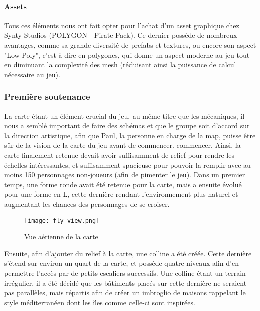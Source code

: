     \paragraph{Assets}

        Tous ces éléments nous ont fait opter pour l'achat d'un asset graphique chez 
        Synty Studios (POLYGON - Pirate Pack).
        Ce dernier possède de nombreux avantages, comme sa grande diversité de prefabs et 
        textures, ou encore son aspect "Low Poly", 
        c'est-à-dire en polygones, qui donne un aspect moderne au jeu tout en diminuant la 
        complexité des mesh (réduisant ainsi la 
        puissance de calcul nécessaire au jeu).
        

\vspace{0.5cm}
\subsubsection{Première soutenance}
\vspace{0.5cm}

    La carte étant un élément crucial du jeu, au même titre que les mécaniques, 
    il nous a semblé important de faire des schémas et que le groupe soit d'accord sur la direction artistique,
    afin que Paul, la personne en charge de la map, puisse être sûr de la vision de la carte du jeu avant de commencer.
    commencer. Ainsi, la carte finalement retenue devait avoir suffisamment de 
    relief pour rendre les échelles intéressantes, et suffisamment spacieuse pour 
    pouvoir la remplir avec au moins 150 personnages non-joueurs (afin de pimenter le jeu).
    Dans un premier temps, une forme ronde avait été retenue pour la carte, mais 
    a ensuite évolué pour une forme en L, cette dernière rendant l’environnement 
    plus naturel et augmentant les chances des personnages de se croiser.

    \begin{figure}[hbt!]
        \centering
        \texttt{[image: fly\_view.png]}
        \caption{Vue aérienne de la carte}
    \end{figure}
    \FloatBarrier

    Ensuite, afin d’ajouter du relief à la carte, une colline a été créée. 
    Cette dernière s’étend sur environ un quart de la carte, et possède quatre 
    niveaux afin d’en permettre l’accès par de petits escaliers successifs. 
    Une colline étant un terrain irrégulier, il a été décidé que les bâtiments 
    placés sur cette dernière ne seraient pas parallèles, mais répartis afin de 
    créer un imbroglio de maisons rappelant le style méditerranéen dont les îles 
    comme celle-ci sont inspirées.
    

